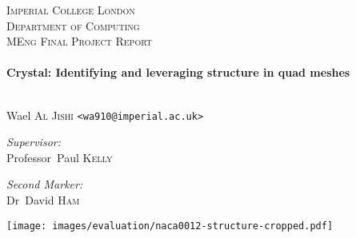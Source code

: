 \begin{titlepage}
\begin{center}

\null
\vspace{0.45cm}

\textsc{\LARGE Imperial College London\\\vspace{0.3 em}Department of Computing}\\[1.5cm]

\textsc{\Large MEng Final Project Report}\\[0.5cm]

\HRule \\[0.4cm]
{ \LARGE \bfseries Crystal: Identifying and leveraging structure in quad meshes \\[0.4cm] }

\HRule \\[0.6cm]


{\large Wael \textsc{Al Jishi} \texttt{<wa910@imperial.ac.uk>}}
\vspace{0.7 cm}

\begin{minipage}{0.4\textwidth}
\begin{flushleft} \large
\emph{Supervisor:} \\
Professor~Paul \textsc{Kelly}
\end{flushleft}
\end{minipage}
\begin{minipage}{0.4\textwidth}
\begin{flushright} \large
\emph{Second Marker:} \\
Dr~David \textsc{Ham}
\end{flushright}
\end{minipage}

\vfill

\centering
\texttt{[image: images/evaluation/naca0012-structure-cropped.pdf]}

\end{center}
\end{titlepage}

